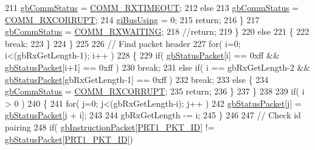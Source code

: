\begin{DoxyCode}
211                     \hyperlink{classdynamixel_a5b603f6bed7ccc595f1f50bd6a6ebbfc}{gbCommStatus} = \hyperlink{dynamixel_8h_af9976398353d104bb8a78b1f02f9fceb}{COMM\_RXTIMEOUT};
212                 \textcolor{keywordflow}{else}
213                     \hyperlink{classdynamixel_a5b603f6bed7ccc595f1f50bd6a6ebbfc}{gbCommStatus} = \hyperlink{dynamixel_8h_a93c30bd345d8077112f0a3524d26278b}{COMM\_RXCORRUPT};
214                 \hyperlink{classdynamixel_ad10e0e49f5fef04bf789a89c14cc470a}{giBusUsing} = 0;
215                 \textcolor{keywordflow}{return};
216             \}
217             \hyperlink{classdynamixel_a5b603f6bed7ccc595f1f50bd6a6ebbfc}{gbCommStatus} = \hyperlink{dynamixel_8h_ae4b5e71a685506956bf151e3117f3487}{COMM\_RXWAITING};
218             \textcolor{comment}{//return;           }
219         \}
220         \textcolor{keywordflow}{else}
221         \{
222             \textcolor{keywordflow}{break};
223         \}
224     \}
225 
226     \textcolor{comment}{// Find packet header}
227     \textcolor{keywordflow}{for}( i=0; i<(gbRxGetLength-1); i++ )
228     \{
229         \textcolor{keywordflow}{if}( \hyperlink{classdynamixel_aa57c86d3bbbeaf5c9d4f6bd00376b04f}{gbStatusPacket}[i] == 0xff && \hyperlink{classdynamixel_aa57c86d3bbbeaf5c9d4f6bd00376b04f}{gbStatusPacket}[i+1] == 0xff )
230             \textcolor{keywordflow}{break};
231         \textcolor{keywordflow}{else} \textcolor{keywordflow}{if}( i == gbRxGetLength-2 && \hyperlink{classdynamixel_aa57c86d3bbbeaf5c9d4f6bd00376b04f}{gbStatusPacket}[gbRxGetLength-1] == 0xff )
232             \textcolor{keywordflow}{break};
233         \textcolor{keywordflow}{else} \{
234             \hyperlink{classdynamixel_a5b603f6bed7ccc595f1f50bd6a6ebbfc}{gbCommStatus} = \hyperlink{dynamixel_8h_a93c30bd345d8077112f0a3524d26278b}{COMM\_RXCORRUPT};
235             \textcolor{keywordflow}{return};
236         \}
237     \}
238 
239     \textcolor{keywordflow}{if}( i > 0 )
240     \{
241         \textcolor{keywordflow}{for}( j=0; j<(gbRxGetLength-i); j++ )
242             \hyperlink{classdynamixel_aa57c86d3bbbeaf5c9d4f6bd00376b04f}{gbStatusPacket}[j] = \hyperlink{classdynamixel_aa57c86d3bbbeaf5c9d4f6bd00376b04f}{gbStatusPacket}[j + i];
243             
244         gbRxGetLength -= i;     
245     \}
246 
247     \textcolor{comment}{// Check id pairing}
248     \textcolor{keywordflow}{if}( \hyperlink{classdynamixel_afd94dcf01b8e96298727776e222de722}{gbInstructionPacket}[\hyperlink{dynamixel_8h_a3c2bb339c587abadd977eb2f14daeff9}{PRT1\_PKT\_ID}] != 
      \hyperlink{classdynamixel_aa57c86d3bbbeaf5c9d4f6bd00376b04f}{gbStatusPacket}[\hyperlink{dynamixel_8h_a3c2bb339c587abadd977eb2f14daeff9}{PRT1\_PKT\_ID}])

\end{DoxyCode}
